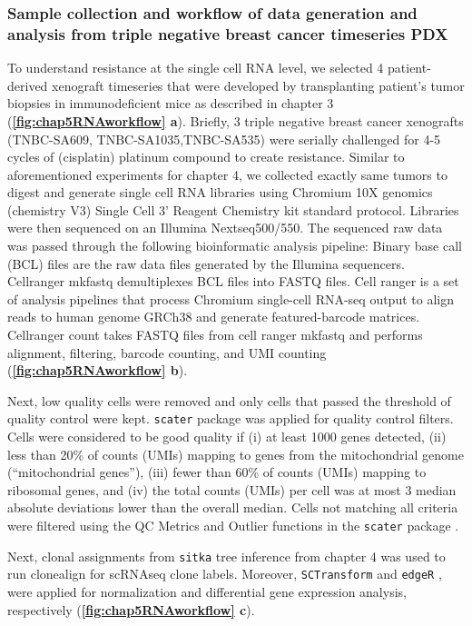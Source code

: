 \subsubsection{Sample collection and workflow of data generation and analysis from triple negative breast cancer timeseries PDX}
To understand resistance at the single cell RNA level, we selected 4  patient-derived xenograft timeseries that were developed by transplanting patient's tumor biopsies in immunodeficient mice as described in chapter 3 (\textbf{\autoref{fig:chap5RNAworkflow} a}). 
Briefly, 3 triple negative breast cancer xenografts (TNBC-SA609, TNBC-SA1035,TNBC-SA535) were serially challenged for 4-5 cycles of (cisplatin) platinum compound to create resistance.
Similar to aforementioned experiments for chapter 4, we collected exactly same tumors to digest and generate single cell RNA libraries using Chromium 10X genomics (chemistry V3) Single Cell 3' Reagent Chemistry kit standard protocol. Libraries were then sequenced on an Illumina Nextseq500/550. The sequenced raw data was passed through the following bioinformatic analysis pipeline: 
Binary base call (BCL) files are the raw data files generated by the Illumina sequencers. Cellranger mkfastq demultiplexes BCL files into FASTQ files. Cell ranger is a set of analysis pipelines that process Chromium single-cell RNA-seq output to align reads to human genome GRCh38 and generate featured-barcode matrices. Cellranger count takes FASTQ files from cell ranger mkfastq and performs alignment, filtering, barcode counting, and UMI counting (\textbf{\autoref{fig:chap5RNAworkflow} b}). 

Next, low quality cells were removed and only cells that passed the threshold of quality control were kept. 
 \texttt{scater} package was applied for quality control filters. Cells were considered to be good quality if (i) at least 1000 genes detected, (ii) less than 20\% of counts (UMIs) mapping to genes from the mitochondrial genome (``mitochondrial genes''), (iii) fewer than 60\% of counts (UMIs) mapping to ribosomal genes, and (iv) the total counts (UMIs) per cell was at most 3 median absolute deviations lower than the overall median. Cells not matching all criteria were filtered using the \ac{QC} Metrics and Outlier functions in the \texttt{scater} package \cite{mccarthy2017scater}.

Next, clonal assignments from \texttt{sitka} tree inference from chapter 4 was used to run clonealign \cite{campbell2019clonealign} for \ac{scRNAseq} clone labels. Moreover, \texttt{SCTransform} \cite{hafemeister2019normalization} and \texttt{edgeR} \cite{robinson2010edger}, were applied for normalization and differential gene expression analysis, respectively (\textbf{\autoref{fig:chap5RNAworkflow} c}). 


